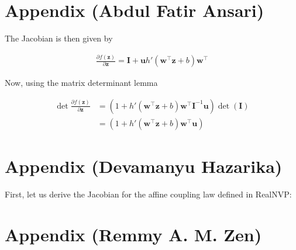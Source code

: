 \documentclass[runningheads]{llncs}
\begin{document}
\section{Appendix (Abdul Fatir Ansari)}


The Jacobian is then given by

\begin{align*}
\frac{\partial f(\mathbf{z})}{\partial \mathbf{z}} = \mathbf{I} + \mathbf{u}h'(\mathbf{w}^\top\mathbf{z} + b)\mathbf{w}^\top
\end{align*}

Now, using the matrix determinant lemma

\begin{align}
\det\frac{\partial f(\mathbf{z})}{\partial \mathbf{z}} &= (1 + h'(\mathbf{w}^\top\mathbf{z} + b)\mathbf{w}^\top\mathbf{I}^{-1}\mathbf{u})\det(\mathbf{I})\\
&=(1 + h'(\mathbf{w}^\top\mathbf{z} + b)\mathbf{w}^\top\mathbf{u})\label{eq:planar-det}
\end{align}

\section{Appendix (Devamanyu Hazarika)}

First, let us derive the Jacobian for the affine coupling law defined in RealNVP:


\section{Appendix (Remmy A. M. Zen)}
\end{document}
